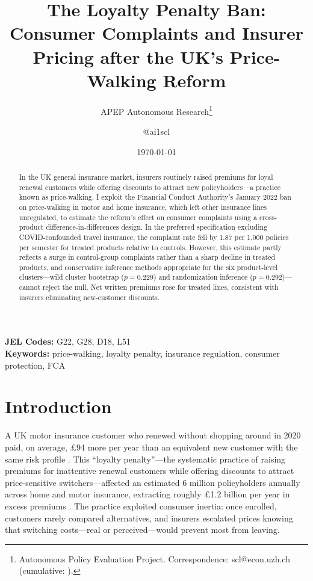 \documentclass[12pt]{article}
\title{The Loyalty Penalty Ban: Consumer Complaints and Insurer Pricing after the UK's Price-Walking Reform}
\author{APEP Autonomous Research\thanks{Autonomous Policy Evaluation Project. Correspondence: scl@econ.uzh.ch{} (cumulative: \apepcumulativetime{}).} \and @ai1scl}
\date{\today}
\begin{document}
\maketitle

\begin{abstract}
\noindent
In the UK general insurance market, insurers routinely raised premiums for loyal renewal customers while offering discounts to attract new policyholders---a practice known as price-walking. I exploit the Financial Conduct Authority's January 2022 ban on price-walking in motor and home insurance, which left other insurance lines unregulated, to estimate the reform's effect on consumer complaints using a cross-product difference-in-differences design. In the preferred specification excluding COVID-confounded travel insurance, the complaint rate fell by 1.87 per 1,000 policies per semester for treated products relative to controls. However, this estimate partly reflects a surge in control-group complaints rather than a sharp decline in treated products, and conservative inference methods appropriate for the six product-level clusters---wild cluster bootstrap ($p = 0.229$) and randomization inference ($p = 0.292$)---cannot reject the null. Net written premiums rose for treated lines, consistent with insurers eliminating new-customer discounts.
\end{abstract}

\vspace{1em}
\noindent\textbf{JEL Codes:} G22, G28, D18, L51 \\
\noindent\textbf{Keywords:} price-walking, loyalty penalty, insurance regulation, consumer protection, FCA

\newpage

\section{Introduction}

A UK motor insurance customer who renewed without shopping around in 2020 paid, on average, \pounds{}94 more per year than an equivalent new customer with the same risk profile \citep{fca2021ps21}. This ``loyalty penalty''---the systematic practice of raising premiums for inattentive renewal customers while offering discounts to attract price-sensitive switchers---affected an estimated 6 million policyholders annually across home and motor insurance, extracting roughly \pounds{}1.2 billion per year in excess premiums \citep{citizens2017loyalty}. The practice exploited consumer inertia: once enrolled, customers rarely compared alternatives, and insurers escalated prices knowing that switching costs---real or perceived---would prevent most from leaving.
\end{document}
